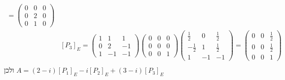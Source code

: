 \begin{align*}
	= \begin{pmatrix}
		0 & 0 & 0 \\
		0 & 2 & 0 \\
		0 & 1 & 0
	\end{pmatrix} \\
	& {[P_3]}_E = 
	\begin{pmatrix}
		1 & 1 & 1 \\
		0 & 2 & -1 \\
		1 & -1 & -1
	\end{pmatrix}
	\begin{pmatrix}
		0 & 0 & 0 \\ 
		0 & 0 & 0 \\ 
		0 & 0 & 1
	\end{pmatrix}
	\begin{pmatrix}
		\frac{1}{2} & 0 & \frac{1}{2} \\
		-\frac{1}{2} & 1 & \frac{1}{2} \\
		1 & -1 & -1
	\end{pmatrix}
	= \begin{pmatrix}
		0 & 0 & \frac{1}{2} \\
		0 & 0 & \frac{1}{2} \\
		0 & 0 & 1
	\end{pmatrix} \\
\end{align*}
ולכן $A = (2 - i) {[P_1]}_E - i {[P_2]}_E + (3 - i) {[P_3]}_E$


